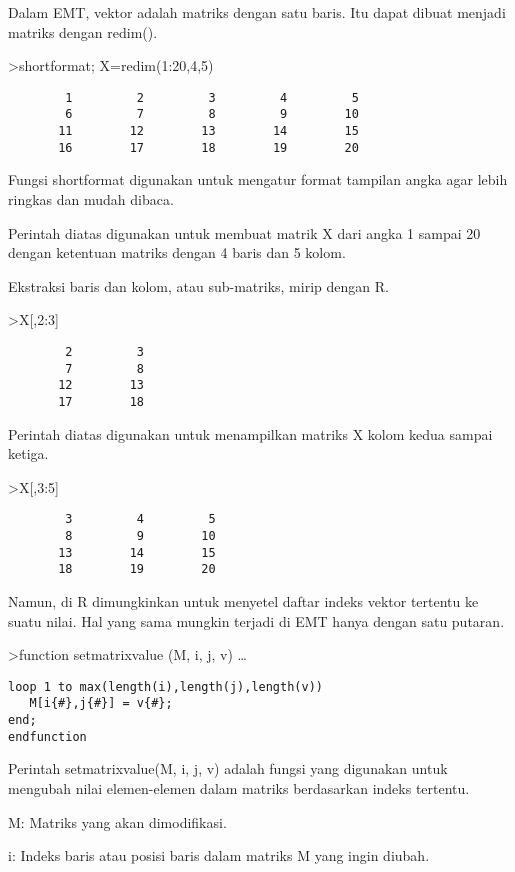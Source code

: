 \documentclass[
]{book}
\begin{document}
Dalam EMT, vektor adalah matriks dengan satu baris. Itu dapat dibuat menjadi matriks dengan redim().

\textgreater shortformat; X=redim(1:20,4,5)

\begin{verbatim}
        1         2         3         4         5 
        6         7         8         9        10 
       11        12        13        14        15 
       16        17        18        19        20 
\end{verbatim}

Fungsi shortformat digunakan untuk mengatur format tampilan angka agar lebih ringkas dan mudah dibaca.

Perintah diatas digunakan untuk membuat matrik X dari angka 1 sampai 20 dengan ketentuan matriks dengan 4 baris dan 5 kolom.

Ekstraksi baris dan kolom, atau sub-matriks, mirip dengan R.

\textgreater X{[},2:3{]}

\begin{verbatim}
        2         3 
        7         8 
       12        13 
       17        18 
\end{verbatim}

Perintah diatas digunakan untuk menampilkan matriks X kolom kedua sampai ketiga.

\textgreater X{[},3:5{]}

\begin{verbatim}
        3         4         5 
        8         9        10 
       13        14        15 
       18        19        20 
\end{verbatim}

Namun, di R dimungkinkan untuk menyetel daftar indeks vektor tertentu ke suatu nilai. Hal yang sama mungkin terjadi di EMT hanya dengan satu putaran.

\textgreater function setmatrixvalue (M, i, j, v) \ldots{}

\begin{verbatim}
loop 1 to max(length(i),length(j),length(v))
   M[i{#},j{#}] = v{#};
end;
endfunction
\end{verbatim}

Perintah setmatrixvalue(M, i, j, v) adalah fungsi yang digunakan untuk mengubah nilai elemen-elemen dalam matriks berdasarkan indeks tertentu.

M: Matriks yang akan dimodifikasi.

i: Indeks baris atau posisi baris dalam matriks M yang ingin diubah.
\end{document}
